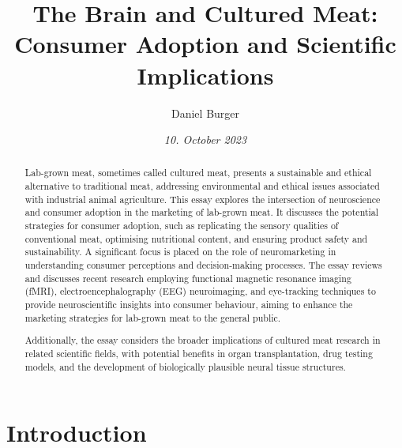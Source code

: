 \documentclass[10pt]{article}
\title{\textbf{The Brain and Cultured Meat:}\\ Consumer Adoption and Scientific Implications}
\author[ ]{Daniel Burger}
\affil[ ]{\textbf{King’s College London}}
\affil[ ]{\href{mailto:public@danielburger.online}{public@danielburger.online}}
\date{\textit{10. October 2023}}
\begin{document}

\maketitle


\begin{sloppypar} %
  \begin{abstract}
    Lab-grown meat, sometimes called cultured meat, presents a sustainable and ethical alternative to traditional meat, addressing environmental and ethical issues associated with industrial animal agriculture. This essay explores the intersection of neuroscience and consumer adoption in the marketing of lab-grown meat. It discusses the potential strategies for consumer adoption, such as replicating the sensory qualities of conventional meat, optimising nutritional content, and ensuring product safety and sustainability. A significant focus is placed on the role of neuromarketing in understanding consumer perceptions and decision-making processes. The essay reviews and discusses recent research employing functional magnetic resonance imaging (fMRI), electroencephalography (EEG) neuroimaging, and eye-tracking techniques to provide neuroscientific insights into consumer behaviour, aiming to enhance the marketing strategies for lab-grown meat to the general public.

    Additionally, the essay considers the broader implications of cultured meat research in related scientific fields, with potential benefits in organ transplantation, drug testing models, and the development of biologically plausible neural tissue structures.
  \end{abstract}
  \pagebreak

  \tableofcontents
  \pagebreak

  \listoffigures
  \pagebreak



  \section{Introduction}
  \label{sec:introduction}


\end{sloppypar}
\end{document}
